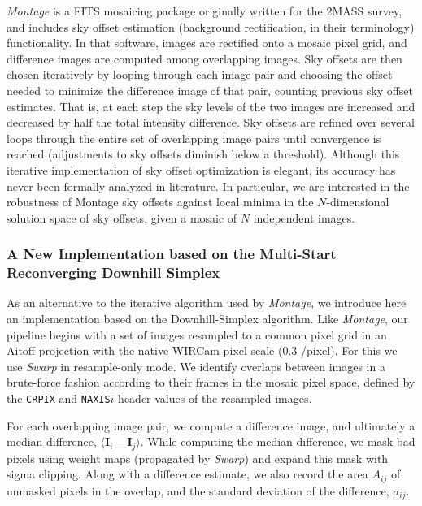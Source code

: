 \documentclass[iop]{emulateapj}
\newcommand{\vect}[1]{\boldsymbol{#1}} %
\newcommand{\sw}[1]{\textit{#1}} %
\begin{document}
\sw{Montage} is a FITS mosaicing package \citep{Berriman:2008} originally written for the 2MASS survey, and includes sky offset estimation (background rectification, in their terminology) functionality.
In that software, images are rectified onto a mosaic pixel grid, and difference images are computed among overlapping images.
Sky offsets are then chosen iteratively by looping through each image pair and choosing the offset needed to minimize the difference image of that pair, counting previous sky offset estimates.
That is, at each step the sky levels of the two images are increased and decreased by half the total intensity difference.
Sky offsets are refined over several loops through the entire set of overlapping image pairs until convergence is reached (adjustments to sky offsets diminish below a threshold).
Although this iterative implementation of sky offset optimization is elegant, its accuracy has never been formally analyzed in literature.
In particular, we are interested in the robustness of Montage sky offsets against local minima in the $N$-dimensional solution space of sky offsets, given a mosaic of $N$ independent images.

\subsubsection{A New Implementation based on the Multi-Start Reconverging Downhill Simplex}
\label{sec:msrnm_algo}

As an alternative to the iterative algorithm used by \sw{Montage}, we introduce here an implementation based on the \cite{Nelder:1965} Downhill-Simplex algorithm.
Like \sw{Montage}, our pipeline begins with a set of images resampled to a common pixel grid in an Aitoff projection with the native WIRCam pixel scale (0.3 \arcsec/pixel).
For this we use \sw{Swarp} \citep{Bertin:2002} in resample-only mode.
We identify overlaps between images in a brute-force fashion according to their frames in the mosaic pixel space, defined by the \texttt{CRPIX} and \texttt{NAXIS}$i$ header values of the resampled images.

For each overlapping image pair, we compute a difference image, and ultimately a median difference, $\langle \vect{I}_i - \vect{I}_j \rangle$.
While computing the median difference, we mask bad pixels using weight maps (propagated by \sw{Swarp}) and expand this mask with sigma clipping.
Along with a difference estimate, we also record the area $A_{ij}$ of unmasked pixels in the overlap, and the standard deviation of the difference, $\sigma_{ij}$.
\end{document}
